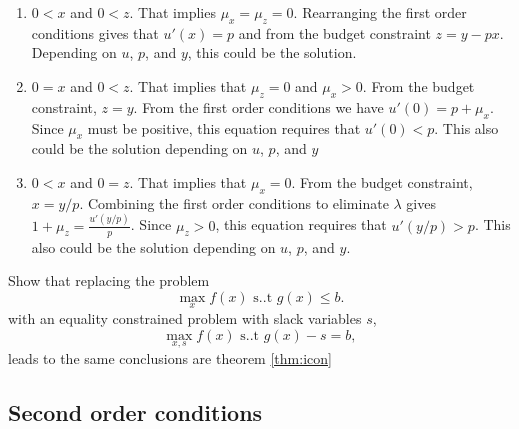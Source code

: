 \begin{example}
\begin{enumerate}
  \item $0 < x$ and $0<z$. That implies $\mu_x = \mu_z =
    0$. Rearranging the first order conditions gives that $u'(x) =
    p$ and from the budget constraint $z = y - p x$. Depending on $u$,
    $p$, and $y$, this could be the solution.
  \item $0 = x$ and $0<z$. That implies that $\mu_z = 0$ and $\mu_x >
    0$. From the budget constraint, $z = y$. From the first order
    conditions we have $u'(0) = p + \mu_x$. Since $\mu_x$ must be
    positive, this equation requires that $u'(0) < p$. This also could
    be the solution depending on $u$, $p$, and $y$
  \item $0 < x$ and $0 = z$. That implies that $\mu_x = 0$. From the
    budget constraint, $x = y/p$. Combining the first order conditions
    to eliminate $\lambda$ gives $1 + \mu_z =
    \frac{u'(y/p)}{p}$. Since $\mu_z>0$, this equation requires that
    $u'(y/p) > p$. This also could be the solution depending on $u$,
    $p$, and $y$.
  \end{enumerate} 
\end{example}

\begin{exercise}
  Show that replacing the problem 
  \[ \max_x f(x) \text{ s..t } g(x) \leq b. \]
  with an equality constrained problem with slack variables $s$, 
  \[ \max_{x,s} f(x) \text{ s..t } g(x) - s = b, \]
  leads to the same conclusions are theorem \ref{thm:icon}
\end{exercise}


\subsection{Second order conditions} 

